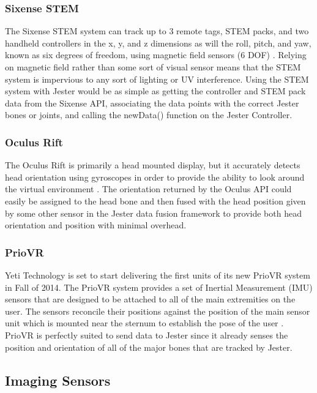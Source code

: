 \subsubsection{Sixense STEM}\label{sec:sixense}

The Sixense STEM system can track up to 3 remote tags, STEM packs, and two handheld controllers in the x, y, and z dimensions as will the roll, pitch, and yaw, known as six degrees of freedom, using magnetic field sensors (6 DOF) \cite{sixense_stem}. Relying on magnetic field rather than some sort of visual sensor means that the STEM system is impervious to any sort of lighting or UV interference. Using the STEM system with Jester would be as simple as getting the controller and STEM pack data from the Sixense API, associating the data points with the correct Jester bones or joints, and calling the newData() function on the Jester Controller.

\subsubsection{Oculus Rift}\label{sec:oculus}

The Oculus Rift is primarily a head mounted display, but it accurately detects head orientation using gyroscopes in order to provide the ability to look around the virtual environment \cite{oculus2012oculus}. The orientation returned by the Oculus API could easily be assigned to the head bone and then fused with the head position given by some other sensor in the Jester data fusion framework to provide both head orientation and position with minimal overhead.

\subsubsection{PrioVR}\label{sec:prio}

Yeti Technology is set to start delivering the first units of its new PrioVR system in Fall of 2014. The PrioVR system provides a set of Inertial Measurement (IMU) sensors that are designed to be attached to all of the main extremities on the user. The sensors reconcile their positions against the position of the main sensor unit which is mounted near the sternum to establish the pose of the user \cite{priovr}. PrioVR is perfectly suited to send data to Jester since it already senses the position and orientation of all of the major bones that are tracked by Jester.

\subsection{Imaging Sensors}

